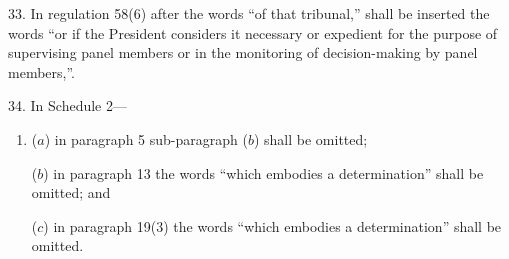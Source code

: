 \documentclass[12pt,a4paper]{article}
\begin{document}
%
%
%
%
%
%
%
%

\medskip

33.  In regulation 58(6) after the words “of that tribunal,” shall be inserted the words “or if the President considers it necessary or expedient for the purpose of supervising panel members or in the monitoring of decision-making by panel members,”.

\medskip

34.  In Schedule 2—
\begin{enumerate}\item[]
($a$) in paragraph 5 sub-paragraph ($b$)  shall be omitted;

($b$) in paragraph 13 the words “which embodies a determination” shall be omitted; and

($c$) in paragraph 19(3) the words “which embodies a determination” shall be omitted.
\end{enumerate}
\end{document}
